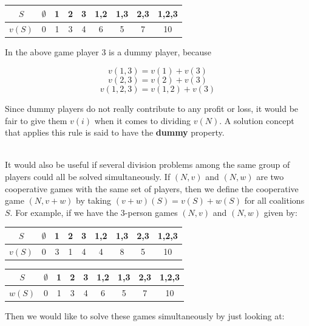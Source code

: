\documentclass[12pt]{article}
\begin{document}
\begin{table}[h]
    \centering
    \begin{tabular}{|c|cccccccc|}
    \hline
    $S$ & $\emptyset$ & 1 & 2 & 3 & 1,2 & 1,3 & 2,3 & 1,2,3 \\ \hline
    $v(S)$ & 0 & 1 & 3 & 4 & 6 & 5 & 7 & 10 \\ \hline
    \end{tabular}
\end{table}

\noindent
In the above game player 3 is a dummy player, because

\[ v(1, 3) = v(1) + v(3) \]
\[ v(2, 3) = v(2) + v(3) \]
\[ v(1, 2, 3) = v(1, 2) + v(3) \]

\noindent
Since dummy players do not really contribute to any profit or loss, it would be fair to give them $v(i)$ when it comes to dividing $v(N)$.
A solution concept that applies this rule is said to have the \textbf{dummy} property.

\noindent
\\
It would also be useful if several division problems among the same group of players could all be solved simultaneously.
If $(N, v)$ and $(N, w)$ are two cooperative games with the same set of players, then we define the cooperative game $(N, v + w)$ by taking $(v + w)(S) = v(S) + w(S)$ for all coalitions $S$.
For example, if we have the 3-person games $(N, v)$ and $(N, w)$ given by:

\newpage
\begin{table}[h]
    \centering
    \begin{tabular}{|c|cccccccc|}
    \hline
    $S$ & $\emptyset$ & 1 & 2 & 3 & 1,2 & 1,3 & 2,3 & 1,2,3 \\ \hline
    $v(S)$ & 0 & 3 & 1 & 4 & 4 & 8 & 5 & 10 \\ \hline
    \end{tabular}
\end{table}

\begin{table}[h]
    \centering
    \begin{tabular}{|c|cccccccc|}
    \hline
    $S$ & $\emptyset$ & 1 & 2 & 3 & 1,2 & 1,3 & 2,3 & 1,2,3 \\ \hline
    $w(S)$ & 0 & 1 & 3 & 4 & 6 & 5 & 7 & 10 \\ \hline
    \end{tabular}
\end{table}

\noindent
Then we would like to solve these games simultaneously by just looking at:
\end{document}
